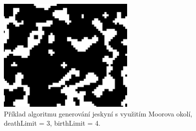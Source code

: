 \begin{figure}[H]
\vspace{0.5cm}
    \centering
    \includegraphics[width=0.6\textwidth]{obrazky-figures/ch2/cave.png}
    \caption{Příklad algoritmu generování jeskyní s využitím Moorova okolí,	deathLimit = 3, birthLimit = 4.}
    \label{fig:cave}
\end{figure}
\vspace{0.5cm}

